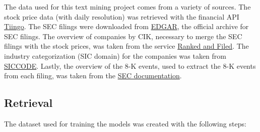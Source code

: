 \documentclass{article}
\begin{document}
	The data used for this text mining project comes from a variety of sources. The stock price data (with daily resolution) was retrieved with the financial API \href{https://www.tiingo.com}{Tiingo}. The SEC filings were downloaded from \href{https://www.sec.gov/Archives/edgar/full-index/}{EDGAR}, the official archive for SEC filings. The overview of companies by CIK, necessary to merge the SEC filings with the stock prices, was taken from the service \href{http://rankandfiled.com/#/data/tickers}{Ranked and Filed}. The industry categorization (SIC domain) for the companies was taken from \href{https://siccode.com}{SICCODE}. Lastly, the overview of the 8-K events, used to extract the 8-K events from each filing, was taken from the  \href{https://www.sec.gov/fast-answers/answersform8khtm.html}{SEC documentation}. 
	
	\subsection{Retrieval}
	
	The dataset used for training the models was created with the following steps: 
	
\end{document}
